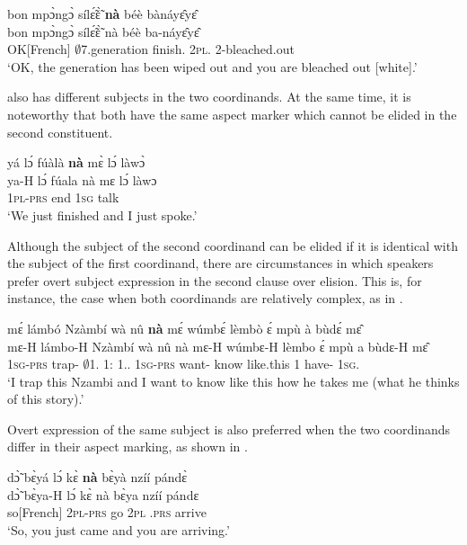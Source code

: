 \ea\label{Coord1}
  \glll bon mpɔ̀ngɔ̀ sílɛ̃́ɛ̃̀ {\bfseries nà} béè bànáyɛ̂yɛ̂  \\
        bon mpɔ̀ngɔ̀ sílɛ̃́ɛ̃̀ nà béè ba-náyɛ̂yɛ̂  \\
      OK[French] $\emptyset$7.generation finish.{\COMPL} {\CONJ} 2\textsc{pl}.{\COP} 2-bleached.out  \\
    \trans `OK, the generation has been wiped out and you are bleached out [white].'
\z

 also has different subjects in the two coordinands.  At the same time, it is noteworthy that both have the same aspect marker which cannot be elided in the second constituent.


\ea\label{Coord2}
  \glll     yá lɔ́ fúàlà {\bfseries nà} mɛ̀ lɔ́ làwɔ̀ \\
           ya-H lɔ́ fúala nà mɛ lɔ́ làwɔ \\
              1\textsc{pl}-\textsc{prs} {\RETRO} end {\CONJ} 1\textsc{sg} {\RETRO} talk \\
    \trans `We just finished and I just spoke.'
\z


Although the subject of the second coordinand can be elided if it is identical with the subject of the first coordinand,  there are circumstances in which speakers prefer overt subject expression in the second clause over elision. This is, for instance, the case when both coordinands are relatively complex, as in .


\ea\label{Coord3}
  \glll mɛ́ lámbó Nzàmbí wà nû {\bfseries nà} mɛ́ wúmbɛ́ lèmbò ɛ́ mpù à bùdɛ́ mɛ̂  \\
       mɛ-H lámbo-H Nzàmbí wà nû nà mɛ-H wúmbɛ-H lèmbo ɛ́ mpù a bùdɛ-H mɛ̂  \\
        1\textsc{sg}-\textsc{prs} trap-{\R} $\emptyset$1.{\PN} 1:{\ATT} 1.{\DEM}.{\PROX} {\CONJ} 1\textsc{sg}-\textsc{prs} want-{\R} know {\LOC} like.this 1 have-{\R} 1\textsc{sg}.{\OBJ}  \\
    \trans `I trap this Nzambi and I want to know like this how he takes me (what he thinks of this story).'
\z

\noindent Overt expression of the same subject is also preferred when the two coordinands differ in their aspect marking, as shown in .


\ea\label{Coord4} 
  \glll  dɔ̃̀ bɛ̀yá lɔ́ kɛ̀ {\bfseries nà} bɛ̀yà nzíí pándɛ̀ \\
          dɔ̃̀ bɛ̀ya-H lɔ́ kɛ̀ nà bɛ̀ya nzíí pándɛ \\
          so[French] 2\textsc{pl}-\textsc{prs} {\RETRO} go {\CONJ} 2\textsc{pl} {\PROG}.\textsc{prs} arrive \\
    \trans `So, you just came and you are arriving.'
\z

